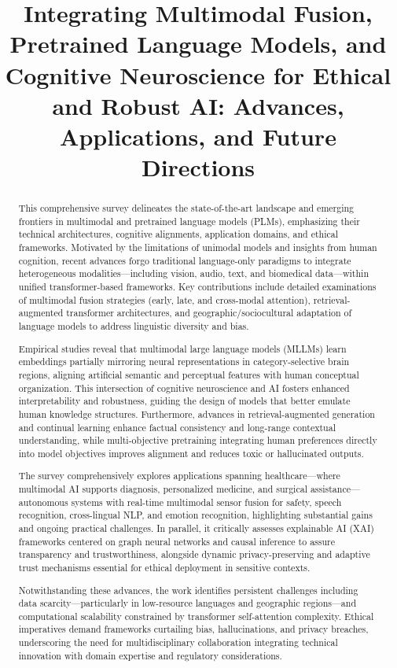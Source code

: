 \documentclass[sigconf]{acmart}
\title{Integrating Multimodal Fusion, Pretrained Language Models, and Cognitive Neuroscience for Ethical and Robust AI: Advances, Applications, and Future Directions}
\begin{document}
\begin{abstract}
This comprehensive survey delineates the state-of-the-art landscape and emerging frontiers in multimodal and pretrained language models (PLMs), emphasizing their technical architectures, cognitive alignments, application domains, and ethical frameworks. Motivated by the limitations of unimodal models and insights from human cognition, recent advances forgo traditional language-only paradigms to integrate heterogeneous modalities—including vision, audio, text, and biomedical data—within unified transformer-based frameworks. Key contributions include detailed examinations of multimodal fusion strategies (early, late, and cross-modal attention), retrieval-augmented transformer architectures, and geographic/sociocultural adaptation of language models to address linguistic diversity and bias.

Empirical studies reveal that multimodal large language models (MLLMs) learn embeddings partially mirroring neural representations in category-selective brain regions, aligning artificial semantic and perceptual features with human conceptual organization. This intersection of cognitive neuroscience and AI fosters enhanced interpretability and robustness, guiding the design of models that better emulate human knowledge structures. Furthermore, advances in retrieval-augmented generation and continual learning enhance factual consistency and long-range contextual understanding, while multi-objective pretraining integrating human preferences directly into model objectives improves alignment and reduces toxic or hallucinated outputs.

The survey comprehensively explores applications spanning healthcare—where multimodal AI supports diagnosis, personalized medicine, and surgical assistance—autonomous systems with real-time multimodal sensor fusion for safety, speech recognition, cross-lingual NLP, and emotion recognition, highlighting substantial gains and ongoing practical challenges. In parallel, it critically assesses explainable AI (XAI) frameworks centered on graph neural networks and causal inference to assure transparency and trustworthiness, alongside dynamic privacy-preserving and adaptive trust mechanisms essential for ethical deployment in sensitive contexts.

Notwithstanding these advances, the work identifies persistent challenges including data scarcity—particularly in low-resource languages and geographic regions—and computational scalability constrained by transformer self-attention complexity. Ethical imperatives demand frameworks curtailing bias, hallucinations, and privacy breaches, underscoring the need for multidisciplinary collaboration integrating technical innovation with domain expertise and regulatory considerations.


\end{abstract}
\end{document}

